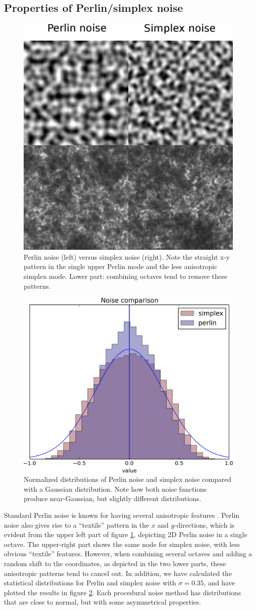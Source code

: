\documentclass[aps,pre,twocolumn,letterpaper,floatfix,showpacs]{revtex4}
\begin{document}
\subsection{Properties of Perlin/simplex noise}
\begin{figure}
\includegraphics[width=.5\textwidth]{noise.eps}
\caption{Perlin noise (left) versus simplex noise (right). Note the
  straight x-y pattern in the single upper Perlin mode and the less
  anisotropic simplex mode. Lower part: combining octaves tend
  to remove these patterns.}
\label{fig:noise}
\end{figure}

\begin{figure}
\includegraphics[width=.5\textwidth]{noise_comparison.png}
\caption{Normalized distributions of Perlin noise and simplex noise compared with a
  Gaussian distribution. Note how both noise functions produce
  near-Gaussian, but slightly different distributions.}
\label{fig:properties}
\end{figure}
Standard Perlin noise is known for having several anisotropic features
\citep{lagae:2010}. Perlin noise also gives rise to a ``textile''
pattern in the $x$ and $y$-directions, which is evident from the upper
left part of figure \ref{fig:noise}, depicting 2D Perlin noise in
a single octave. The upper-right part shows the same node for simplex noise,
with less obvious ``textile'' features. However, when combining several octaves and adding a random shift to the coordinates, as depicted in the two lower parts, these anisotropic patterns tend to cancel
out.  In addition, we have calculated the statistical distributions for Perlin and simplex noise
with $\sigma = 0.35$, and have plotted the results in figure \ref{fig:properties}.
Each procedural noise method has distributions that are close to normal, 
but with some asymmetrical properties. 
\end{document}
